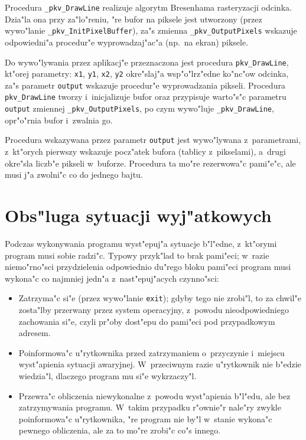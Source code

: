 \vspace{\bigskipamount}                              
Procedura \texttt{\_pkv\_DrawLine} realizuje algorytm Bresenhama rasteryzacji
odcinka. Dzia"la ona przy za"lo"reniu, "re bufor na piksele jest utworzony
(przez wywo"lanie \texttt{\_pkv\_InitPixelBuffer}),
za"s zmienna \texttt{\_pkv\_OutputPixels} wskazuje odpowiedni"a procedur"e
wyprowadzaj"ac"a (np.\ na ekran) piksele.

Do wywo"lywania przez aplikacj"e przeznaczona jest procedura
\texttt{pkv\_DrawLine}, kt"orej parametry: \texttt{x1}, \texttt{y1},
\texttt{x2}, \texttt{y2} okre"slaj"a wsp"o"lrz"edne ko"nc"ow odcinka, za"s
parametr \texttt{output} wskazuje procedur"e wyprowadzania pikseli.
Procedura \texttt{pkv\_DrawLine} tworzy i~inicjalizuje bufor oraz przypisuje
warto"s"c parametru \texttt{output} zmiennej \texttt{\_pkv\_OutputPixels},
po czym wywo"luje \texttt{\_pkv\_DrawLine}, opr"o"rnia bufor i~zwalnia go.

Procedura wskazywana przez parametr \texttt{output} jest wywo"lywana
z~parametrami, z~kt"orych pierwszy wskazuje pocz"atek bufora (tablicy
z~pikselami), a~drugi okre"sla liczb"e pikseli w~buforze. Procedura ta mo"re
rezerwowa"c pami"e"c, ale musi j"a zwolni"c co do jednego bajtu.


\newpage
\section{Obs"luga sytuacji wyj"atkowych}

Podczas wykonywania programu wyst"epuj"a sytuacje b"l"edne, z~kt"orymi
program musi sobie radzi"c. Typowy przyk"lad to brak pami"eci; w~razie
niemo"rno"sci przydzielenia odpowiednio du"rego bloku pami"eci program musi
wykona"c co najmniej jedn"a z~nast"epuj"acych czynno"sci:
\begin{itemize}
\item Zatrzyma"c si"e (przez wywo"lanie \texttt{exit}); gdyby tego nie
  zrobi"l, to za chwil"e zosta"lby przerwany przez system operacyjny,
  z~powodu nieodpowiedniego zachowania si"e, czyli pr"oby dost"epu do
  pami"eci pod przypadkowym adresem.
\item Poinformowa"c u"rytkownika przed zatrzymaniem o~przyczynie i~miejscu
  wyst"apienia sytuacji awaryjnej. W~przeciwnym razie u"rytkownik nie
  b"edzie wiedzia"l, dlaczego program mu si"e wykrzaczy"l.
\item Przewra"c obliczenia niewykonalne z~powodu wyst"apienia b"l"edu, ale
  bez zatrzymywania programu. W~takim przypadku r"ownie"r nale"ry zwykle
  poinformowa"c u"rytkownika, "re program nie by"l w~stanie wykona"c pewnego
  obliczenia, ale za to mo"re zrobi"c co"s innego.
\end{itemize}


